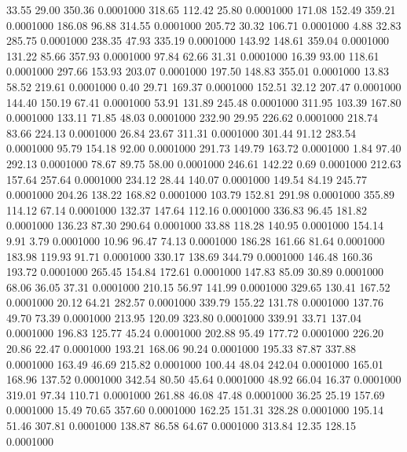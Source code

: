  33.55   29.00  350.36   0.0001000
 318.65  112.42   25.80   0.0001000
 171.08  152.49  359.21   0.0001000
 186.08   96.88  314.55   0.0001000
 205.72   30.32  106.71   0.0001000
   4.88   32.83  285.75   0.0001000
 238.35   47.93  335.19   0.0001000
 143.92  148.61  359.04   0.0001000
 131.22   85.66  357.93   0.0001000
  97.84   62.66   31.31   0.0001000
  16.39   93.00  118.61   0.0001000
 297.66  153.93  203.07   0.0001000
 197.50  148.83  355.01   0.0001000
  13.83   58.52  219.61   0.0001000
   0.40   29.71  169.37   0.0001000
 152.51   32.12  207.47   0.0001000
 144.40  150.19   67.41   0.0001000
  53.91  131.89  245.48   0.0001000
 311.95  103.39  167.80   0.0001000
 133.11   71.85   48.03   0.0001000
 232.90   29.95  226.62   0.0001000
 218.74   83.66  224.13   0.0001000
  26.84   23.67  311.31   0.0001000
 301.44   91.12  283.54   0.0001000
  95.79  154.18   92.00   0.0001000
 291.73  149.79  163.72   0.0001000
   1.84   97.40  292.13   0.0001000
  78.67   89.75   58.00   0.0001000
 246.61  142.22    0.69   0.0001000
 212.63  157.64  257.64   0.0001000
 234.12   28.44  140.07   0.0001000
 149.54   84.19  245.77   0.0001000
 204.26  138.22  168.82   0.0001000
 103.79  152.81  291.98   0.0001000
 355.89  114.12   67.14   0.0001000
 132.37  147.64  112.16   0.0001000
 336.83   96.45  181.82   0.0001000
 136.23   87.30  290.64   0.0001000
  33.88  118.28  140.95   0.0001000
 154.14    9.91    3.79   0.0001000
  10.96   96.47   74.13   0.0001000
 186.28  161.66   81.64   0.0001000
 183.98  119.93   91.71   0.0001000
 330.17  138.69  344.79   0.0001000
 146.48  160.36  193.72   0.0001000
 265.45  154.84  172.61   0.0001000
 147.83   85.09   30.89   0.0001000
  68.06   36.05   37.31   0.0001000
 210.15   56.97  141.99   0.0001000
 329.65  130.41  167.52   0.0001000
  20.12   64.21  282.57   0.0001000
 339.79  155.22  131.78   0.0001000
 137.76   49.70   73.39   0.0001000
 213.95  120.09  323.80   0.0001000
 339.91   33.71  137.04   0.0001000
 196.83  125.77   45.24   0.0001000
 202.88   95.49  177.72   0.0001000
 226.20   20.86   22.47   0.0001000
 193.21  168.06   90.24   0.0001000
 195.33   87.87  337.88   0.0001000
 163.49   46.69  215.82   0.0001000
 100.44   48.04  242.04   0.0001000
 165.01  168.96  137.52   0.0001000
 342.54   80.50   45.64   0.0001000
  48.92   66.04   16.37   0.0001000
 319.01   97.34  110.71   0.0001000
 261.88   46.08   47.48   0.0001000
  36.25   25.19  157.69   0.0001000
  15.49   70.65  357.60   0.0001000
 162.25  151.31  328.28   0.0001000
 195.14   51.46  307.81   0.0001000
 138.87   86.58   64.67   0.0001000
 313.84   12.35  128.15   0.0001000
